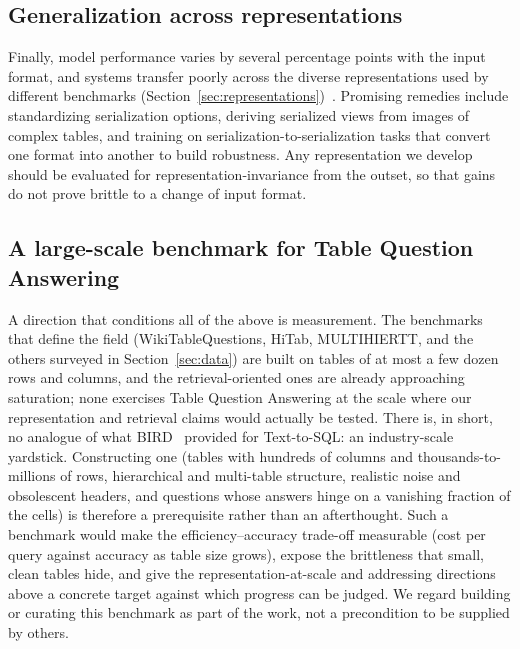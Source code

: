 \subsection{Generalization across representations}
Finally, model performance varies by several percentage points with the input format, and systems transfer poorly across the diverse representations used by different benchmarks (Section~\ref{sec:representations})~\cite{sui2024table}. Promising remedies include standardizing serialization options, deriving serialized views from images of complex tables, and training on serialization-to-serialization tasks that convert one format into another to build robustness. Any representation we develop should be evaluated for representation-invariance from the outset, so that gains do not prove brittle to a change of input format.

\subsection{A large-scale benchmark for Table Question Answering}
A direction that conditions all of the above is measurement. The benchmarks that define the field (WikiTableQuestions, HiTab, MULTIHIERTT, and the others surveyed in Section~\ref{sec:data}) are built on tables of at most a few dozen rows and columns, and the retrieval-oriented ones are already approaching saturation; none exercises Table Question Answering at the scale where our representation and retrieval claims would actually be tested. There is, in short, no analogue of what BIRD~\cite{li2023bird} provided for Text-to-SQL: an industry-scale yardstick. Constructing one (tables with hundreds of columns and thousands-to-millions of rows, hierarchical and multi-table structure, realistic noise and obsolescent headers, and questions whose answers hinge on a vanishing fraction of the cells) is therefore a prerequisite rather than an afterthought. Such a benchmark would make the efficiency--accuracy trade-off measurable (cost per query against accuracy as table size grows), expose the brittleness that small, clean tables hide, and give the representation-at-scale and addressing directions above a concrete target against which progress can be judged. We regard building or curating this benchmark as part of the work, not a precondition to be supplied by others.

